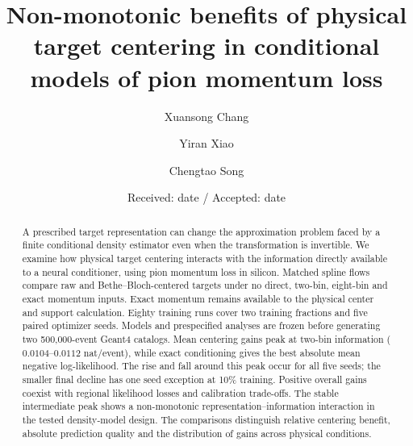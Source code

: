 \documentclass[twocolumn,epjc3]{svjour3}
\begin{document}
\title{Non-monotonic benefits of physical target centering in conditional models of pion momentum loss}

\author{Xuansong Chang \and
        Yiran Xiao \and
        Chengtao Song}



\date{Received: date / Accepted: date}

\maketitle

\begin{abstract}
A prescribed target representation can change the approximation problem faced
by a finite conditional density estimator even when the transformation is
invertible. We examine how physical target centering interacts with the
information directly available to a neural conditioner, using pion momentum
loss in silicon. Matched spline flows compare raw and Bethe--Bloch-centered
targets under no direct, two-bin, eight-bin and exact momentum inputs.
Exact momentum remains available to the physical center and support
calculation. Eighty training runs cover two training fractions and five paired
optimizer seeds. Models and prespecified analyses are frozen before generating two
500,000-event Geant4 catalogs. Mean centering gains peak at two-bin information
($0.0104$--$0.0112$ nat/event), while exact conditioning gives the best absolute
mean negative log-likelihood. The rise and fall around this peak occur for all
five seeds; the smaller final decline has one seed exception at 10\% training.
Positive overall gains coexist with regional likelihood losses and calibration
trade-offs. The stable intermediate peak shows a non-monotonic representation--information
interaction in the tested density-model design. The comparisons distinguish
relative centering benefit, absolute prediction quality and the distribution
of gains across physical conditions.
\end{abstract}
\end{document}
